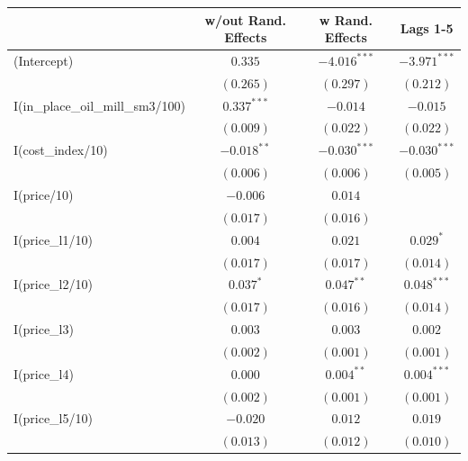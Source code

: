 \documentclass[11pt]{article}
\begin{document}
\begin{table}
\begin{center}
\begin{tabular}{l c c c }
\hline
                                 & w/out Rand. Effects & w Rand. Effects & Lags 1-5 \\
\hline
(Intercept)                      & $0.335$        & $-4.016^{***}$ & $-3.971^{***}$ \\
                                 & $(0.265)$      & $(0.297)$      & $(0.212)$      \\
I(in\_place\_oil\_mill\_sm3/100) & $0.337^{***}$  & $-0.014$       & $-0.015$       \\
                                 & $(0.009)$      & $(0.022)$      & $(0.022)$      \\
I(cost\_index/10)                & $-0.018^{**}$  & $-0.030^{***}$ & $-0.030^{***}$ \\
                                 & $(0.006)$      & $(0.006)$      & $(0.005)$      \\
I(price/10)                      & $-0.006$       & $0.014$        &                \\
                                 & $(0.017)$      & $(0.016)$      &                \\
I(price\_l1/10)                  & $0.004$        & $0.021$        & $0.029^{*}$    \\
                                 & $(0.017)$      & $(0.017)$      & $(0.014)$      \\
I(price\_l2/10)                  & $0.037^{*}$    & $0.047^{**}$   & $0.048^{***}$  \\
                                 & $(0.017)$      & $(0.016)$      & $(0.014)$      \\
I(price\_l3)                     & $0.003$        & $0.003$        & $0.002$        \\
                                 & $(0.002)$      & $(0.001)$      & $(0.001)$      \\
I(price\_l4)                     & $0.000$        & $0.004^{**}$   & $0.004^{***}$  \\
                                 & $(0.002)$      & $(0.001)$      & $(0.001)$      \\
I(price\_l5/10)                  & $-0.020$       & $0.012$        & $0.019$        \\
                                 & $(0.013)$      & $(0.012)$      & $(0.010)$      \\

\end{tabular}
\end{center}
\end{table}
\end{document}
